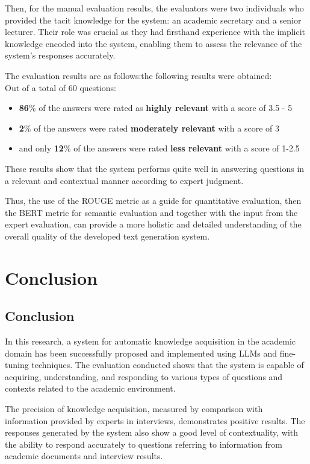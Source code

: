 \documentclass[runningheads]{llncs}
\begin{document}
Then, for the manual evaluation results, the evaluators were two individuals who provided the tacit knowledge for the system: an academic secretary and a senior lecturer. Their role was crucial as they had firsthand experience with the implicit knowledge encoded into the system, enabling them to assess the relevance of the system's responses accurately.

The evaluation results are as follows:the following results were obtained: \\
Out of a total of 60 questions:
\begin{itemize}
    \item \textbf{86}\% of the answers were rated as \textbf{highly relevant} with a score of 3.5 - 5
    \item \textbf{2}\% of the answers were rated \textbf{moderately relevant} with a score of 3
    \item and only \textbf{12}\% of the answers were rated \textbf{less relevant} with a score of 1-2.5
\end{itemize}

These results show that the system performs quite well in answering questions in a relevant and contextual manner according to expert judgment.

Thus, the use of the ROUGE metric as a guide for quantitative evaluation, then the BERT metric for semantic evaluation and together with the input from the expert evaluation, can provide a more holistic and detailed understanding of the overall quality of the developed text generation system.

\section{Conclusion}
\subsection{Conclusion}
In this research, a system for automatic knowledge acquisition in the academic domain has been successfully proposed and implemented using LLMs and fine-tuning techniques. The evaluation conducted shows that the system is capable of acquiring, understanding, and responding to various types of questions and contexts related to the academic environment.

The precision of knowledge acquisition, measured by comparison with information provided by experts in interviews, demonstrates positive results. The responses generated by the system also show a good level of contextuality, with the ability to respond accurately to questions referring to information from academic documents and interview results.
\end{document}
